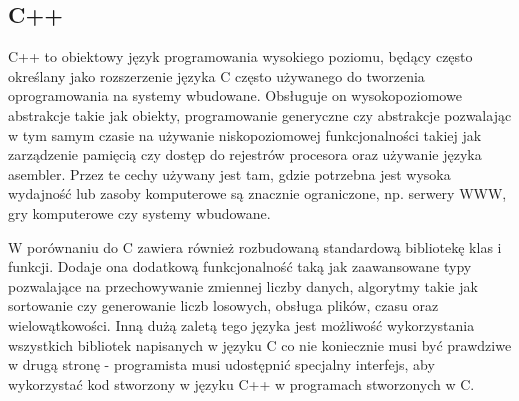 \subsection*{C++}
C++ to obiektowy język programowania wysokiego poziomu, będący często określany jako
rozszerzenie języka C często używanego do tworzenia oprogramowania na systemy wbudowane.
Obsługuje on wysokopoziomowe abstrakcje takie jak obiekty, programowanie generyczne czy
abstrakcje pozwalając w tym samym czasie na używanie niskopoziomowej funkcjonalności 
takiej jak zarządzenie pamięcią czy dostęp do rejestrów procesora oraz używanie języka asembler.
Przez te cechy używany jest tam, gdzie potrzebna jest wysoka wydajność lub zasoby komputerowe
są znacznie ograniczone, np. serwery WWW, gry komputerowe czy systemy wbudowane.

W porównaniu do C zawiera również rozbudowaną standardową bibliotekę klas i funkcji.
Dodaje ona dodatkową funkcjonalność taką jak zaawansowane typy pozwalające na
przechowywanie zmiennej liczby danych, algorytmy takie jak sortowanie czy 
generowanie liczb losowych, obsługa plików, czasu oraz wielowątkowości.
Inną dużą zaletą tego języka jest możliwość wykorzystania wszystkich bibliotek napisanych
w języku C co nie koniecznie musi być prawdziwe w drugą stronę - programista musi
udostępnić specjalny interfejs, aby wykorzystać kod stworzony w języku C++
w programach stworzonych w C.
